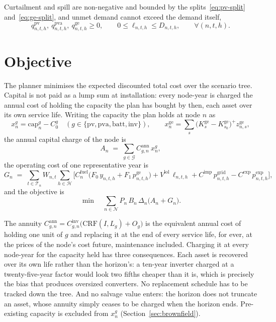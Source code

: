 \documentclass[11pt,a4paper]{article}
\theoremstyle{plain}
\theoremstyle{definition}
\newcommand{\CRF}{\mathrm{CRF}}
\begin{document}
Curtailment and spill are non-negative and bounded by the splits~\eqref{eq:pv-split}
and~\eqref{eq:ge-split}, and unmet demand cannot exceed the demand itself,
\begin{equation}
  q^{\mathrm{pv}}_{n,t,h},\ q^{\mathrm{pva}}_{n,t,h},\ q^{\mathrm{ge}}_{n,t,h} \ge 0,
  \qquad
  0 \leq \ell_{n,t,h} \leq D_{n,t,h},
  \qquad \forall (n,t,h).
  \label{eq:slacks}
\end{equation}

\section{Objective}
\label{sec:objective}

The planner minimises the expected discounted total cost over the scenario tree. Capital is
not paid as a lump sum at installation: every node-year is charged the annual cost of
holding the capacity the plan has bought by then, each asset over its own service life.
Writing the capacity the plan holds at node $n$ as
\begin{equation}
  x^{g}_n = \mathrm{cap}^{g}_n - C^{g}_0
  \quad (g\in\{\mathrm{pv},\mathrm{pva},\mathrm{batt},\mathrm{inv}\}),
  \qquad
  x^{\mathrm{ge}}_n = \sum_{s} \big(K^{\mathrm{ge}}_s-K^{\mathrm{ge}}_{s_0}\big)^{+}
  z^{\mathrm{ge}}_{n,s},
\end{equation}
the annual capital charge of the node is
\begin{equation}
  A_n \;=\; \sum_{g\in\mathcal{G}} C^{\mathrm{ann}}_{g,n}\, x^{g}_n,
  \label{eq:capital}
\end{equation}
the operating cost of one representative year is
\begin{equation}
  G_n \;=\; \sum_{t\in\mathcal{T}_n} W_{n,t} \sum_{h\in\mathcal{H}}
  \Big[
    C^{\mathrm{fuel}}_n\big(F_0\,y_{n,t,h} + F_1\,p^{\mathrm{ge}}_{n,t,h}\big)
    + V^{\mathrm{lol}}\,\ell_{n,t,h}
    + C^{\mathrm{imp}}\,p^{\mathrm{grid}}_{n,t,h}
    - C^{\mathrm{exp}}\,p^{\mathrm{exp}}_{n,t,h}
  \Big],
  \label{eq:operating}
\end{equation}
and the objective is
\begin{equation}
  \min \quad
  \sum_{n\in\mathcal{N}} P_n\,B_n\,\Delta_n
  \big( A_n + G_n \big).
  \label{eq:objective}
\end{equation}

The annuity $C^{\mathrm{ann}}_{g,n}=C^{\mathrm{inv}}_{g,n}\big(\CRF(I,L_g)+O_g\big)$ is the
equivalent annual cost of holding one unit of $g$ and replacing it at the end of every service life, for
ever, at the prices of the node's cost future, maintenance included. Charging it at every
node-year for the capacity held has three consequences. Each asset is recovered over its
own life rather than the horizon's: a ten-year inverter charged at a twenty-five-year factor
would look two fifths cheaper than it is, which is precisely the bias that produces
oversized converters. No replacement schedule has to be tracked down the tree. And no
salvage value enters: the horizon does not truncate an asset, whose annuity simply ceases
to be charged when the horizon ends. Pre-existing capacity is excluded from $x^{g}_n$
(Section~\ref{sec:brownfield}).
\end{document}
